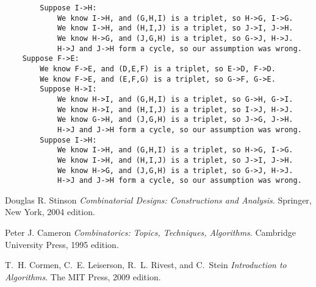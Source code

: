 \documentclass[12pt,x11names, rgb]{article}
\begin{document}
\begin{verbatim}
        Suppose I->H:
            We know I->H, and (G,H,I) is a triplet, so H->G, I->G.
            We know I->H, and (H,I,J) is a triplet, so J->I, J->H.
            We know H->G, and (J,G,H) is a triplet, so G->J, H->J.
            H->J and J->H form a cycle, so our assumption was wrong.
    Suppose F->E:
        We know F->E, and (D,E,F) is a triplet, so E->D, F->D.
        We know F->E, and (E,F,G) is a triplet, so G->F, G->E.
        Suppose H->I:
            We know H->I, and (G,H,I) is a triplet, so G->H, G->I.
            We know H->I, and (H,I,J) is a triplet, so I->J, H->J.
            We know G->H, and (J,G,H) is a triplet, so J->G, J->H.
            H->J and J->H form a cycle, so our assumption was wrong.
        Suppose I->H:
            We know I->H, and (G,H,I) is a triplet, so H->G, I->G.
            We know I->H, and (H,I,J) is a triplet, so J->I, J->H.
            We know H->G, and (J,G,H) is a triplet, so G->J, H->J.
            H->J and J->H form a cycle, so our assumption was wrong.
\end{verbatim}

\begin{thebibliography}{9}

    Douglas R. Stinson
    \emph{Combinatorial Designs: Constructions and Analysis}.
    Springer, New York,
    2004 edition.

    Peter J. Cameron
    \emph{Combinatorics: Topics, Techniques, Algorithms}.
    Cambridge University Press,
    1995 edition.

    T.~H. Cormen, C.~E. Leiserson, R.~L. Rivest, and C.~Stein
    \emph{Introduction to Algorithms}.
    The MIT Press,
    2009 edition.


\end{thebibliography}
\end{document}

